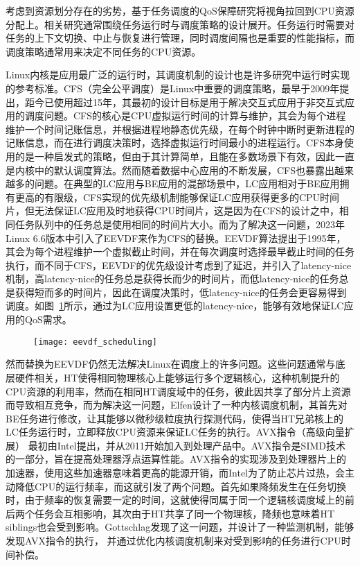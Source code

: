 
考虑到资源划分存在的劣势，基于任务调度的QoS保障研究将视角拉回到CPU资源分配上。相关研究通常围绕任务运行时与调度策略的设计展开。任务运行时需要对任务的上下文切换、中止与恢复进行管理，同时调度间隔也是重要的性能指标，而调度策略通常用来决定不同任务的CPU资源。

Linux内核是应用最广泛的运行时，其调度机制的设计也是许多研究中运行时实现的参考标准。CFS（完全公平调度）\citep{pabla2009completely}是Linux中重要的调度策略，最早于2009年提出，距今已使用超过15年，其最初的设计目标是用于解决交互式应用于非交互式应用的调度问题。CFS的核心是CPU虚拟运行时间的计算与维护，其会为每个进程维护一个时间记账信息，并根据进程地静态优先级，在每个时钟中断时更新进程的记账信息，而在进行调度决策时，选择虚拟运行时间最小的进程运行。CFS本身使用的是一种启发式的策略，但由于其计算简单，且能在多数场景下有效，因此一直是内核中的默认调度算法。然而随着数据中心应用的不断发展，CFS也暴露出越来越多的问题。在典型的LC应用与BE应用的混部场景中，LC应用相对于BE应用拥有更高的有限级，CFS实现的优先级机制能够保证LC应用获得更多的CPU时间片，但无法保证LC应用及时地获得CPU时间片，这是因为在CFS的设计之中，相同任务队列中的任务总是使用相同的时间片大小。而为了解决这一问题，2023年Linux 6.6版本中引入了EEVDF来作为CFS的替换。EEVDF算法\citep{stoica1995earliest}提出于1995年，其会为每个进程维护一个虚拟截止时间，并在每次调度时选择最早截止时间的任务执行，而不同于CFS，EEVDF的优先级设计考虑到了延迟，并引入了latency-nice机制，高latency-nice的任务总是获得长而少的时间片，而低latency-nice的任务总是获得短而多的时间片，因此在调度决策时，低latency-nice的任务会更容易得到调度。如图~\ref{fig:eevdf_scheduling}所示，通过为LC应用设置更低的latency-nice，能够有效地保证LC应用的QoS需求。

\begin{figure}[!htbp]
    \centering
    \texttt{[image: eevdf\_scheduling]}
    \label{fig:eevdf_scheduling}
\end{figure}

然而替换为EEVDF仍然无法解决Linux在调度上的许多问题。这些问题通常与底层硬件相关，HT使得相同物理核心上能够运行多个逻辑核心，这种机制提升的CPU资源的利用率，然而在相同HT调度域中的任务，彼此因共享了部分片上资源而导致相互竞争，而为解决这一问题，Elfen\citep{yang2016elfen}设计了一种内核调度机制，其首先对BE任务进行修改，让其能够以微秒级粒度执行探测代码，使得当HT兄弟核上的LC任务运行时，立即释放CPU资源来保证LC任务的执行。AVX指令（高级向量扩展）\citep{guide2011intel} 最初由Intel提出，并从2011开始加入到处理产品中。AVX指令是SIMD技术的一部分，旨在提高处理器浮点运算性能。AVX指令的实现涉及到处理器片上的加速器，使用这些加速器意味着更高的能源开销，而Intel为了防止芯片过热，会主动降低CPU的运行频率，而这就引发了两个问题。首先如果降频发生在任务切换时，由于频率的恢复需要一定的时间，这就使得同属于同一个逻辑核调度域上的前后两个任务会互相影响，其次由于HT共享了同一个物理核，降频也意味着HT siblings也会受到影响。Gottschlag\citep{gottschlag2020avx}发现了这一问题，并设计了一种监测机制，能够发现AVX指令的执行， 并通过优化内核调度机制来对受到影响的任务进行CPU时间补偿。

